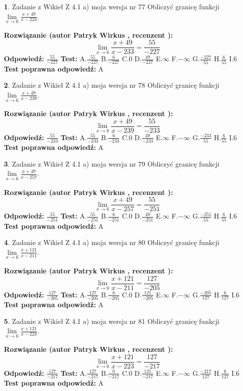 \documentclass[12pt, a4paper]{article}
\theoremstyle{definition} %
\newtheorem{zad}{}
\newcommand{\zadStart}[1]{\begin{zad}#1\newline}
\newcommand{\zadStop}{\end{zad}}
\newcommand{\rozwStart}[2]{\noindent \textbf{Rozwiązanie (autor #1 , recenzent #2): }\newline}
\newcommand{\rozwStop}{\newline}
\newcommand{\odpStart}{\noindent \textbf{Odpowiedź:}\newline}
\newcommand{\odpStop}{\newline}
\newcommand{\testStart}{\noindent \textbf{Test:}\newline}
\newcommand{\testStop}{\newline}
\newcommand{\kluczStart}{\noindent \textbf{Test poprawna odpowiedź:}\newline}
\newcommand{\kluczStop}{\newline}
\begin{document}
\zadStart{Zadanie z Wikieł Z 4.1 a) moja wersja nr 77}
Obliczyć granicę funkcji $\lim\limits_{x\to6}\frac{x+49}{x-233}$.
\zadStop
\rozwStart{Patryk Wirkus}{}
$$\lim\limits_{x\to6}\frac{x+49}{x-233} = \frac{55}{-227}$$
\rozwStop
\odpStart
$\frac{55}{-227}$
\odpStop
\testStart
A.$\frac{55}{-227}$
B.$\frac{6}{-227}$
C.$0$
D.$\frac{49}{-227}$
E.$\infty$
F.$-\infty$
G.$\frac{-227}{55}$
H.$\frac{6}{55}$
I.$6$
\testStop
\kluczStart
A
\kluczStop



\zadStart{Zadanie z Wikieł Z 4.1 a) moja wersja nr 78}
Obliczyć granicę funkcji $\lim\limits_{x\to6}\frac{x+49}{x-239}$.
\zadStop
\rozwStart{Patryk Wirkus}{}
$$\lim\limits_{x\to6}\frac{x+49}{x-239} = \frac{55}{-233}$$
\rozwStop
\odpStart
$\frac{55}{-233}$
\odpStop
\testStart
A.$\frac{55}{-233}$
B.$\frac{6}{-233}$
C.$0$
D.$\frac{49}{-233}$
E.$\infty$
F.$-\infty$
G.$\frac{-233}{55}$
H.$\frac{6}{55}$
I.$6$
\testStop
\kluczStart
A
\kluczStop



\zadStart{Zadanie z Wikieł Z 4.1 a) moja wersja nr 79}
Obliczyć granicę funkcji $\lim\limits_{x\to6}\frac{x+49}{x-257}$.
\zadStop
\rozwStart{Patryk Wirkus}{}
$$\lim\limits_{x\to6}\frac{x+49}{x-257} = \frac{55}{-251}$$
\rozwStop
\odpStart
$\frac{55}{-251}$
\odpStop
\testStart
A.$\frac{55}{-251}$
B.$\frac{6}{-251}$
C.$0$
D.$\frac{49}{-251}$
E.$\infty$
F.$-\infty$
G.$\frac{-251}{55}$
H.$\frac{6}{55}$
I.$6$
\testStop
\kluczStart
A
\kluczStop



\zadStart{Zadanie z Wikieł Z 4.1 a) moja wersja nr 80}
Obliczyć granicę funkcji $\lim\limits_{x\to6}\frac{x+121}{x-211}$.
\zadStop
\rozwStart{Patryk Wirkus}{}
$$\lim\limits_{x\to6}\frac{x+121}{x-211} = \frac{127}{-205}$$
\rozwStop
\odpStart
$\frac{127}{-205}$
\odpStop
\testStart
A.$\frac{127}{-205}$
B.$\frac{6}{-205}$
C.$0$
D.$\frac{121}{-205}$
E.$\infty$
F.$-\infty$
G.$\frac{-205}{127}$
H.$\frac{6}{127}$
I.$6$
\testStop
\kluczStart
A
\kluczStop



\zadStart{Zadanie z Wikieł Z 4.1 a) moja wersja nr 81}
Obliczyć granicę funkcji $\lim\limits_{x\to6}\frac{x+121}{x-223}$.
\zadStop
\rozwStart{Patryk Wirkus}{}
$$\lim\limits_{x\to6}\frac{x+121}{x-223} = \frac{127}{-217}$$
\rozwStop
\odpStart
$\frac{127}{-217}$
\odpStop
\testStart
A.$\frac{127}{-217}$
B.$\frac{6}{-217}$
C.$0$
D.$\frac{121}{-217}$
E.$\infty$
F.$-\infty$
G.$\frac{-217}{127}$
H.$\frac{6}{127}$
I.$6$
\testStop
\kluczStart
A
\kluczStop
\end{document}
